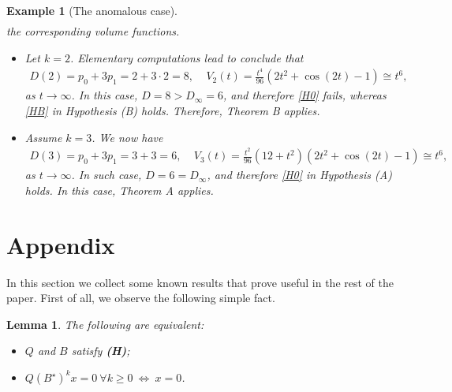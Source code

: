 \documentclass[11pt,letter]{amsart}
\numberwithin{equation}{section}
\newtheorem{lemma}[theorem]{Lemma}
\newtheorem{example}[theorem]{Example}
\numberwithin{equation}{section}
\begin{document}
\begin{example}[The anomalous case]
{\begin{align*}
\end{align*}
the corresponding volume functions.
\begin{itemize}
\item Let $k=2$. Elementary computations lead to conclude that 
\begin{align*}
D(2)=p_{0}+3p_{1}=2+3 \cdot 2=8,\ \ \ \ \ V_{2}(t) = \frac{t^{4}}{96}(2t^{2}+\cos(2t)-1)\cong t^6,
\end{align*} 
as $t\to \infty$.
In this case, $D = 8>D_\infty = 6$, and therefore \eqref{H0} fails, whereas \eqref{HB} in Hypothesis (B) holds. Therefore, Theorem B applies.
\item Assume $k=3$. We now have
\begin{align*}
D(3)=p_{0}+3p_{1}=3+3=6,\ \ \ \ \ V_{3}(t)=\frac{t^{2}}{96}(12+t^{2})(2t^{2}+\cos(2t)-1)\cong t^6,
\end{align*}
as $t\to \infty$. In such case, $D = 6 = D_\infty$, and therefore \eqref{H0} in Hypothesis (A) holds. In this case, Theorem A applies.
\end{itemize}}

\end{example}



















\section{Appendix}\label{S:prelim}

In this section we collect some known results that prove useful in the rest of the paper. First of all, we observe the following simple fact.

\begin{lemma}\label{L:QB}
The following are equivalent:
\begin{itemize}
\item[(i)] $Q$ and $B$ satisfy \emph{\textbf{(H)}};
\item[(ii)] $Q (B^\star)^k x = 0\ \forall k\ge 0\ \Longleftrightarrow\ x = 0$.
\end{itemize}
\end{lemma}
\end{document}
